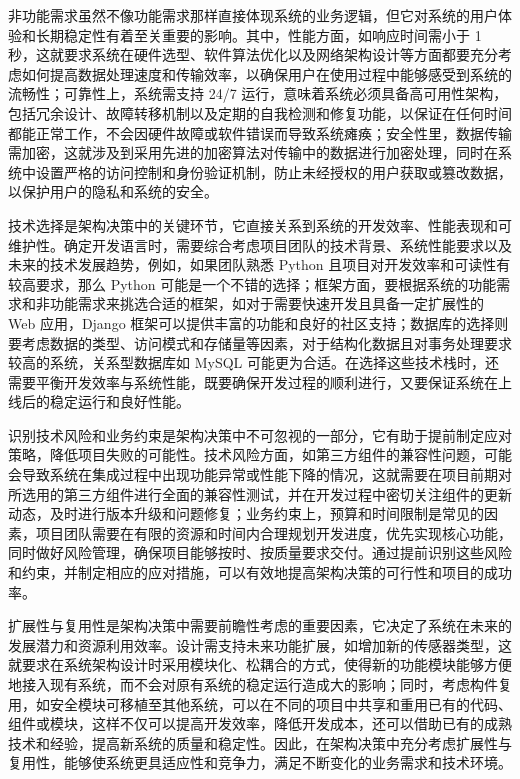 
非功能需求虽然不像功能需求那样直接体现系统的业务逻辑，但它对系统的用户体验和长期稳定性有着至关重要的影响。其中，性能方面，如响应时间需小于 1 秒，这就要求系统在硬件选型、软件算法优化以及网络架构设计等方面都要充分考虑如何提高数据处理速度和传输效率，以确保用户在使用过程中能够感受到系统的流畅性；可靠性上，系统需支持 24/7 运行，意味着系统必须具备高可用性架构，包括冗余设计、故障转移机制以及定期的自我检测和修复功能，以保证在任何时间都能正常工作，不会因硬件故障或软件错误而导致系统瘫痪；安全性里，数据传输需加密，这就涉及到采用先进的加密算法对传输中的数据进行加密处理，同时在系统中设置严格的访问控制和身份验证机制，防止未经授权的用户获取或篡改数据，以保护用户的隐私和系统的安全。


技术选择是架构决策中的关键环节，它直接关系到系统的开发效率、性能表现和可维护性。确定开发语言时，需要综合考虑项目团队的技术背景、系统性能要求以及未来的技术发展趋势，例如，如果团队熟悉 Python 且项目对开发效率和可读性有较高要求，那么 Python 可能是一个不错的选择；框架方面，要根据系统的功能需求和非功能需求来挑选合适的框架，如对于需要快速开发且具备一定扩展性的 Web 应用，Django 框架可以提供丰富的功能和良好的社区支持；数据库的选择则要考虑数据的类型、访问模式和存储量等因素，对于结构化数据且对事务处理要求较高的系统，关系型数据库如 MySQL 可能更为合适。在选择这些技术栈时，还需要平衡开发效率与系统性能，既要确保开发过程的顺利进行，又要保证系统在上线后的稳定运行和良好性能。


识别技术风险和业务约束是架构决策中不可忽视的一部分，它有助于提前制定应对策略，降低项目失败的可能性。技术风险方面，如第三方组件的兼容性问题，可能会导致系统在集成过程中出现功能异常或性能下降的情况，这就需要在项目前期对所选用的第三方组件进行全面的兼容性测试，并在开发过程中密切关注组件的更新动态，及时进行版本升级和问题修复；业务约束上，预算和时间限制是常见的因素，项目团队需要在有限的资源和时间内合理规划开发进度，优先实现核心功能，同时做好风险管理，确保项目能够按时、按质量要求交付。通过提前识别这些风险和约束，并制定相应的应对措施，可以有效地提高架构决策的可行性和项目的成功率。


扩展性与复用性是架构决策中需要前瞻性考虑的重要因素，它决定了系统在未来的发展潜力和资源利用效率。设计需支持未来功能扩展，如增加新的传感器类型，这就要求在系统架构设计时采用模块化、松耦合的方式，使得新的功能模块能够方便地接入现有系统，而不会对原有系统的稳定运行造成大的影响；同时，考虑构件复用，如安全模块可移植至其他系统，可以在不同的项目中共享和重用已有的代码、组件或模块，这样不仅可以提高开发效率，降低开发成本，还可以借助已有的成熟技术和经验，提高新系统的质量和稳定性。因此，在架构决策中充分考虑扩展性与复用性，能够使系统更具适应性和竞争力，满足不断变化的业务需求和技术环境。


